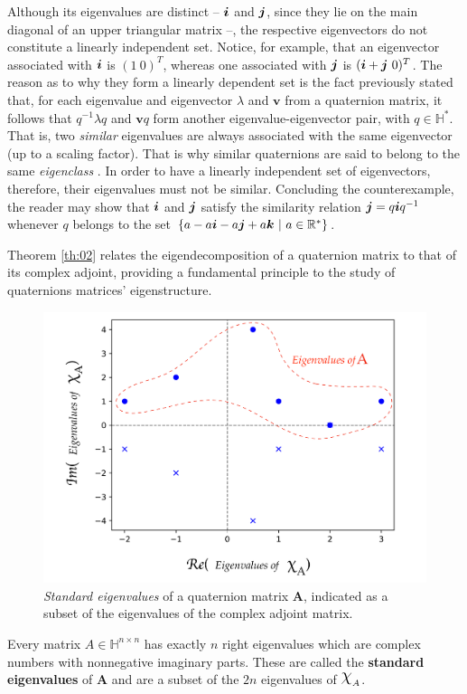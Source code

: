 Although its eigenvalues are distinct -- $ \boldsymbol{i} $ and $ \boldsymbol{j} $, since they lie on the main diagonal of an upper triangular matrix --, the respective eigenvectors do not constitute a linearly independent set. Notice, for example, that an eigenvector associated with $ \boldsymbol{i} $ is $ (1 \ 0)^T $, whereas one associated with $ \boldsymbol{j} $ is $ (\boldsymbol{i} + \boldsymbol{j} \ 0)^T $. The reason as to why they form a linearly dependent set is the fact previously stated that, for each eigenvalue and eigenvector $ \lambda $ and $ \mathbf{v} $ from a quaternion matrix, it follows that $ q^{-1}\lambda q $ and $ \mathbf{v}q $ form another eigenvalue-eigenvector pair, with $ q \in \mathbb{H}^\ast $. That is, two \emph{similar} eigenvalues are always associated with the same eigenvector (up to a scaling factor). That is why similar quaternions are said to belong to the same \emph{eigenclass} \cite{de2000right}. In order to have a linearly independent set of eigenvectors, therefore, their eigenvalues must not be similar. Concluding the counterexample, the reader may show that $ \boldsymbol{i} $ and $ \boldsymbol{j} $ satisfy the similarity relation $ \boldsymbol{j} = q \boldsymbol{i} q^{-1} $ whenever $q$ belongs to the set $ \{ a - a\boldsymbol{i} - a\boldsymbol{j} + a\boldsymbol{k} \ | \ a\in \mathbb{R}^\ast \} $.

Theorem \ref{th:02} relates the eigendecomposition of a quaternion matrix to that of its complex adjoint, providing a fundamental principle to the study of quaternions matrices' eigenstructure.

\begin{figure}
    \centering
    \includegraphics[width=0.7\linewidth]{Figures/complex_adjoint_eigvals_EN.pdf}
    \caption{\emph{Standard eigenvalues} of a quaternion matrix $ \mathbf{A} $, indicated as a subset of the eigenvalues of the complex adjoint matrix.}
\end{figure}


\begin{theorem}
    \label{th:02}
    Every matrix $ A \in \mathbb{H}^{n \times n} $ has exactly $ n $ right eigenvalues which are complex numbers with nonnegative imaginary parts. These are called the \textbf{standard eigenvalues} of $ \mathbf{A} $ and are a subset of the $ 2n $ eigenvalues of $ \rchi_A $.
\end{theorem}


